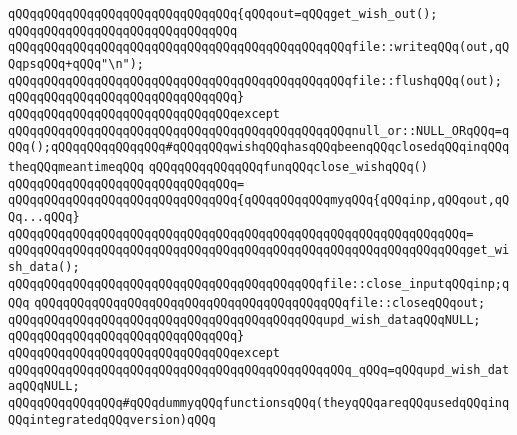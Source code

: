 \verb|qQQqqQQqqQQqqQQqqQQqqQQqqQQqqQQq{qQQqout=qQQqget_wish_out();|\newline
\verb|qQQqqQQqqQQqqQQqqQQqqQQqqQQqqQQq|\newline
\verb|qQQqqQQqqQQqqQQqqQQqqQQqqQQqqQQqqQQqqQQqqQQqqQQqfile::writeqQQq(out,qQQqpsqQQq+qQQq"\n");|\newline
\verb|qQQqqQQqqQQqqQQqqQQqqQQqqQQqqQQqqQQqqQQqqQQqqQQqfile::flushqQQq(out);|\newline
\verb|qQQqqQQqqQQqqQQqqQQqqQQqqQQqqQQq}|\newline
\verb|qQQqqQQqqQQqqQQqqQQqqQQqqQQqqQQqexcept|\newline
\verb|qQQqqQQqqQQqqQQqqQQqqQQqqQQqqQQqqQQqqQQqqQQqqQQqnull_or::NULL_ORqQQq=qQQq();qQQqqQQqqQQqqQQq#qQQqqQQqwishqQQqhasqQQqbeenqQQqclosedqQQqinqQQqtheqQQqmeantimeqQQq|\newline
\newline
\newline
\verb|qQQqqQQqqQQqqQQqfunqQQqclose_wishqQQq()|\newline
\verb|qQQqqQQqqQQqqQQqqQQqqQQqqQQqqQQq=|\newline
\verb|qQQqqQQqqQQqqQQqqQQqqQQqqQQqqQQq{qQQqqQQqqQQqmyqQQq{qQQqinp,qQQqout,qQQq...qQQq}|\newline
\verb|qQQqqQQqqQQqqQQqqQQqqQQqqQQqqQQqqQQqqQQqqQQqqQQqqQQqqQQqqQQqqQQq=|\newline
\verb|qQQqqQQqqQQqqQQqqQQqqQQqqQQqqQQqqQQqqQQqqQQqqQQqqQQqqQQqqQQqqQQqget_wish_data();|\newline
\newline
\verb|qQQqqQQqqQQqqQQqqQQqqQQqqQQqqQQqqQQqqQQqqQQqfile::close_inputqQQqinp;qQQq|\newline
\verb|qQQqqQQqqQQqqQQqqQQqqQQqqQQqqQQqqQQqqQQqqQQqfile::closeqQQqout;|\newline
\verb|qQQqqQQqqQQqqQQqqQQqqQQqqQQqqQQqqQQqqQQqqQQqupd_wish_dataqQQqNULL;|\newline
\newline
\verb|qQQqqQQqqQQqqQQqqQQqqQQqqQQqqQQq}|\newline
\verb|qQQqqQQqqQQqqQQqqQQqqQQqqQQqqQQqexcept|\newline
\verb|qQQqqQQqqQQqqQQqqQQqqQQqqQQqqQQqqQQqqQQqqQQqqQQq_qQQq=qQQqupd_wish_dataqQQqNULL;|\newline
\newline
\newline
\newline
\verb|qQQqqQQqqQQqqQQq#qQQqdummyqQQqfunctionsqQQq(theyqQQqareqQQqusedqQQqinqQQqintegratedqQQqversion)qQQq|\newline

